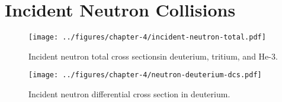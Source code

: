 \section{Incident Neutron Collisions}

\begin{figure}[!htb]
  \centering
  \texttt{[image: ../figures/chapter-4/incident-neutron-total.pdf]}
  \caption{Incident neutron total cross sectionsin deuterium, tritium, and He-3.}
\end{figure}

\begin{figure}[!htb]
  \centering
  \texttt{[image: ../figures/chapter-4/neutron-deuterium-dcs.pdf]}
  \caption{Incident neutron differential cross section in deuterium.}
\end{figure}